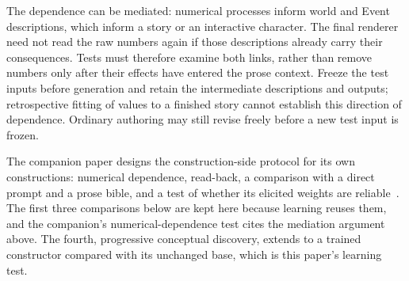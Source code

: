 \documentclass[10pt]{article}
\begin{document}
The dependence can be mediated: numerical processes inform world and Event
descriptions, which inform a story or an interactive character. The final
renderer need not read the raw numbers again if those descriptions already
carry their consequences. Tests must therefore examine both links, rather
than remove numbers only after their effects have entered the prose context.
Freeze the test inputs before generation and retain the intermediate
descriptions and outputs; retrospective fitting of values to a finished story
cannot establish this direction of dependence. Ordinary authoring may still
revise freely before a new test input is frozen.

The companion paper designs the construction-side protocol for its own
constructions: numerical dependence, read-back, a comparison with a direct
prompt and a prose bible, and a test of whether its elicited weights are
reliable~\cite{westerbergMeaning2026}. The first three comparisons below are
kept here because learning reuses them, and the companion's
numerical-dependence test cites the mediation argument above. The fourth,
progressive conceptual discovery, extends to a trained constructor compared
with its unchanged base, which is this paper's learning test.
\end{document}
